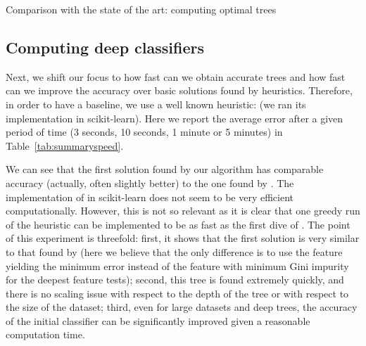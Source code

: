 \documentclass{llncs}
\begin{document}
% 


\begin{table}[htbp]
\begin{center}
\begin{footnotesize}
\tabcolsep=1.7pt

\end{footnotesize}
\end{center}
\caption{\label{tab:summaryacc} Comparison with the state of the art: computing optimal trees}
\end{table}


\subsection{Computing deep classifiers}

Next, we shift our focus to how fast can we obtain accurate trees and how fast can we improve the accuracy over basic solutions found by heuristics.
Therefore, in order to have a baseline, we use a well known heuristic: \cart (we ran its implementation in scikit-learn).
Here we report the average error after a given period of time (3 seconds, 10 seconds, 1 minute or 5 minutes) in Table~\ref{tab:summaryspeed}.


\medskip

We can see that the first solution found by our algorithm has comparable accuracy (actually, often slightly better) to the one found by \cart. The implementation of \cart in scikit-learn does not seem to be very efficient computationally. However, this is not so relevant as it is clear that one greedy run of the heuristic can be implemented to be as fast as the first dive of \budalg. The point of this experiment is threefold: first, it shows that the first solution is very similar to that found by \cart (here we believe that the only difference is to use the feature yielding the minimum error instead of the feature with minimum Gini impurity for the deepest feature tests); second, this tree
is found extremely quickly, and there is no scaling issue with respect to the depth of the tree or with respect to the size of the dataset; third, even for large datasets and deep trees, the accuracy of the initial classifier can be significantly improved given a reasonable computation time.
\end{document}
